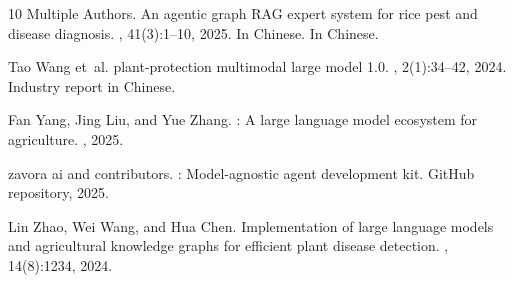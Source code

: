 \documentclass[11pt,a4paper]{article}
\begin{document}
\begin{thebibliography}{10}
Multiple Authors.
\newblock An agentic graph {RAG} expert system for rice pest and disease
  diagnosis.
, 41(3):1--10, 2025.
\newblock In Chinese.
\newblock In Chinese.

Tao Wang et~al.
 plant-protection multimodal large model 1.0.
, 2(1):34--42, 2024.
\newblock Industry report in Chinese.

Fan Yang, Jing Liu, and Yue Zhang.
: A large language model ecosystem for agriculture.
, 2025.

zavora ai and contributors.
: Model-agnostic agent development kit.
\newblock GitHub repository, 2025.

Lin Zhao, Wei Wang, and Hua Chen.
\newblock Implementation of large language models and agricultural knowledge
  graphs for efficient plant disease detection.
, 14(8):1234, 2024.

\end{thebibliography}
\end{document}

